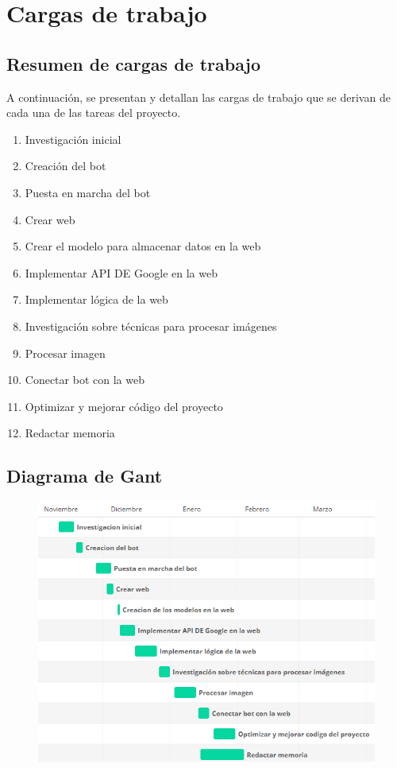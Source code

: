 \chapter{Cargas de trabajo}\label{int}
\thispagestyle{fancy}


\section{Resumen de cargas de trabajo}
A continuación, se presentan y detallan las cargas de trabajo que se derivan de cada una de
las tareas del proyecto.
\begin{enumerate}
    \item Investigación inicial
    \item Creación del bot
    \item Puesta en marcha del bot
    \item Crear web
    \item Crear el modelo para almacenar datos en la web
    \item Implementar API DE Google en la web
    \item Implementar lógica de la web
    \item Investigación sobre técnicas para procesar imágenes
    \item Procesar imagen
    \item Conectar bot con la web
    \item Optimizar y mejorar código del proyecto
    \item Redactar memoria
\end{enumerate}
\section{ Diagrama de Gant}
\begin{figure}[h]
\centering
\includegraphics[scale=0.75]{imgs/gant.png}
\end{figure}